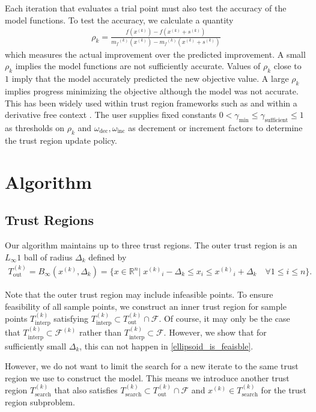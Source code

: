\documentclass{article}
\theoremstyle{case}
\newcommand{\dk}{\Delta_k}
\newcommand{\feasiblek}{{\mathcal F^{(k)}}}
\newcommand{\feasible}{{\mathcal F}}
\newcommand{\gammabi}{\gamma_{\text{sufficient}}}
\newcommand{\gammasm}{\gamma_{\text{min}}}
\newcommand{\mfk}{{{m}_f}^{(k)}}
\newcommand{\omegadec}{\omega_{\text{dec}}}
\newcommand{\omegainc}{\omega_{\text{inc}}}
\newcommand{\outertrk}{{T_{\text{out}}^{(k)}}}
\newcommand{\rk}{\rho_k}
\newcommand{\Rn}{\mathbb R^n}
\newcommand{\sampletrk}{{T_{\text{interp}}^{(k)}}}
\newcommand{\searchtrk}{{T_{\text{search}}^{(k)}}}
\newcommand{\sk}{{{s}^{(k)}}}
\newcommand{\tr}{{ B_{\infty}\left(\xk, \dk\right) }}
\newcommand{\xk}{{x^{(k)}}}
\begin{document}
Each iteration that evaluates a trial point must also test the accuracy of the model functions.
To test the accuracy, we calculate a quantity
\begin{align}
\label{define_rhok}
\rk = \frac{f(\xk) - f(\xk+\sk)}{\mfk(\xk) - \mfk(\xk+\sk)}
\end{align}
which measures the actual improvement over the predicted improvement.
A small $\rk$ implies the model functions are not sufficiently accurate.
Values of $\rk$ close to $1$ imply that the model accurately predicted the new objective value.
A large $\rk$ implies progress minimizing the objective although the model was not accurate.
This has been widely used within trust region frameworks such as \cite{Conn:2000:TM:357813} and within a derivative free context \cite{DUMMY:intro_book}.
The user supplies fixed constants $0 < \gammasm \le \gammabi \le 1$ as thresholds on $\rk$ and $\omegadec, \omegainc$ as decrement or increment factors to determine the trust region update policy.


\section{Algorithm}

\subsection{Trust Regions}
Our algorithm maintains up to three trust regions.
The outer trust region is an $L_{\infty}1$ ball of radius $ \dk $ defined by
\begin{align}
\outertrk = \tr = \{x\in \Rn | \; {\xk}_i - \dk \le x_i \le {\xk}_i + \dk \quad \forall 1\le i \le n\}. \label{define_outer_trust_region}
\end{align}

Note that the outer trust region may include infeasible points.
To ensure feasibility of all sample points, we construct an inner trust region for sample points $ \sampletrk $  satisfying 
$\sampletrk \subset \outertrk \cap \feasible$.
Of course, it may only be the case that $\sampletrk \subset \feasiblek$ rather than $\sampletrk \subset \feasible$.
However, we show that for sufficiently small $\dk$, this can not happen in \cref{ellipsoid_is_feaisble}.

However, we do not want to limit the search for a new iterate to the same trust region we use to construct the model.
This means we introduce another trust region $ \searchtrk $ that also satisfies 
$ \searchtrk \subset \outertrk \cap \feasible$ and $\xk \in \searchtrk $ for the trust region subproblem.
\end{document}
